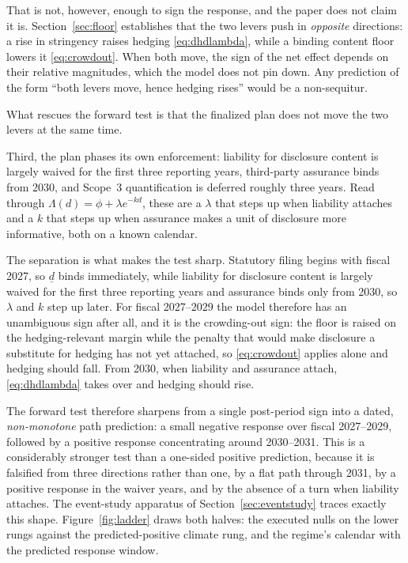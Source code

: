 \documentclass[11pt,a4paper]{article}
\begin{document}
That is not, however, enough to sign the response, and the paper does not claim it is. Section~\ref{sec:floor} establishes that the two levers push in \emph{opposite} directions: a rise in stringency raises hedging \eqref{eq:dhdlambda}, while a binding content floor lowers it \eqref{eq:crowdout}. When both move, the sign of the net effect depends on their relative magnitudes, which the model does not pin down. Any prediction of the form ``both levers move, hence hedging rises'' would be a non-sequitur.

What rescues the forward test is that the finalized plan does not move the two levers at the same time.

Third, the plan phases its own enforcement: liability for disclosure content is largely waived for the first three reporting years, third-party assurance binds from 2030, and Scope~3 quantification is deferred roughly three years. Read through $\Lambda(d)=\phi+\lambda e^{-kd}$, these are a $\lambda$ that steps up when liability attaches and a $k$ that steps up when assurance makes a unit of disclosure more informative, both on a known calendar.

The separation is what makes the test sharp. Statutory filing begins with fiscal 2027, so $\underline{d}$ binds immediately, while liability for disclosure content is largely waived for the first three reporting years and assurance binds only from 2030, so $\lambda$ and $k$ step up later. For fiscal 2027--2029 the model therefore has an unambiguous sign after all, and it is the crowding-out sign: the floor is raised on the hedging-relevant margin while the penalty that would make disclosure a substitute for hedging has not yet attached, so \eqref{eq:crowdout} applies alone and hedging should fall. From 2030, when liability and assurance attach, \eqref{eq:dhdlambda} takes over and hedging should rise.

The forward test therefore sharpens from a single post-period sign into a dated, \emph{non-monotone} path prediction: a small negative response over fiscal 2027--2029, followed by a positive response concentrating around 2030--2031. This is a considerably stronger test than a one-sided positive prediction, because it is falsified from three directions rather than one, by a flat path through 2031, by a positive response in the waiver years, and by the absence of a turn when liability attaches. The event-study apparatus of Section~\ref{sec:eventstudy} traces exactly this shape. Figure~\ref{fig:ladder} draws both halves: the executed nulls on the lower rungs against the predicted-positive climate rung, and the regime's calendar with the predicted response window.
\end{document}
